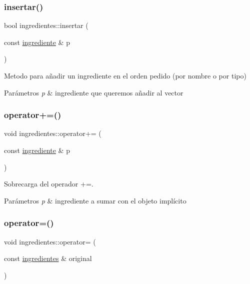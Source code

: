\subsubsection{\texorpdfstring{insertar()}{insertar()}}
{\footnotesize\ttfamily bool ingredientes\+::insertar (\begin{DoxyParamCaption}\item[{const \hyperlink{classingrediente}{ingrediente} \&}]{p }\end{DoxyParamCaption})}



Metodo para añadir un ingrediente en el orden pedido (por nombre o por tipo) 


\begin{DoxyParams}{Parámetros}
{\em p} & ingrediente que queremos añadir al vector \\
\hline
\end{DoxyParams}
\mbox{\label{classingredientes_a24ea8c982877578bff6e0f450c4b79a6}} 
\subsubsection{\texorpdfstring{operator+=()}{operator+=()}}
{\footnotesize\ttfamily void ingredientes\+::operator+= (\begin{DoxyParamCaption}\item[{const \hyperlink{classingrediente}{ingrediente} \&}]{p }\end{DoxyParamCaption})}



Sobrecarga del operador +=. 


\begin{DoxyParams}{Parámetros}
{\em p} & ingrediente a sumar con el objeto implícito \\
\hline
\end{DoxyParams}
\mbox{\label{classingredientes_ab5478a896ab96486a86dfb1b5707c565}} 
\subsubsection{\texorpdfstring{operator=()}{operator=()}}
{\footnotesize\ttfamily void ingredientes\+::operator= (\begin{DoxyParamCaption}\item[{const \hyperlink{classingredientes}{ingredientes} \&}]{original }\end{DoxyParamCaption})}



